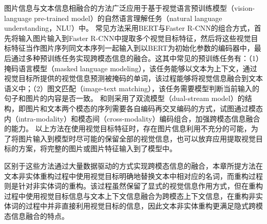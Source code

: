 图片信息与文本信息相融合的方法广泛应用于基于视觉语言预训练模型（vision-language pre-trained model）的自然语言理解任务（natural language understanding，NLU）中。
常见方法采用BERT与Faster R-CNN的组合方式，首先将输入图片输入到Faster R-CNN中提取多个视觉目标特征，然后将这些视觉目标特征当作图片序列同文本序列一起输入到以BERT为初始化参数的编码器中，最后通过多种预训练任务实现跨模态信息的融合。这其中常见的预训练任务有：（1）掩码语言模型（masked language modeling），该任务能够以文本为上下文，通过视觉目标所提供的视觉信息预测被掩码的单词，该过程能够将视觉信息融合到文本语义中；（2）图文匹配（image-text matching），该任务需要模型判断当前输入的句子和图片的内容是否一致。
和则采用了双流模型（dual-stream model）的结构，即图片和文本两个模态的序列需要各自编码再交叉编码的方式，试图通过模态内（intra-modality）和模态间（cross-modality）编码组合，加强跨模态信息融合的能力。
以上方法在使用视觉目标特征时，存在图片信息利用不充分的可能，为了将图片输入到模型时尽可能的保留全部的视觉信息，也可以放弃应用提取视觉目标的方案，将完整的图片或图片特征输入到了模型中。

区别于这些方法通过大量数据驱动的方式实现跨模态信息的融合，本章所提方法在文本非实体重构过程中使用视觉目标明确地替换文本中相对应的名词，而重构过程则是针对非实体词的重构。该过程虽然保留了显式的视觉信息作用方式，但在重构过程中使用视觉目标信息与文本上下文信息融合为跨模态上下文信息，在重构非实体词的过程中并非直接利用视觉目标的信息，因此文本非实体重构更满足隐式跨模态信息融合的特点。






